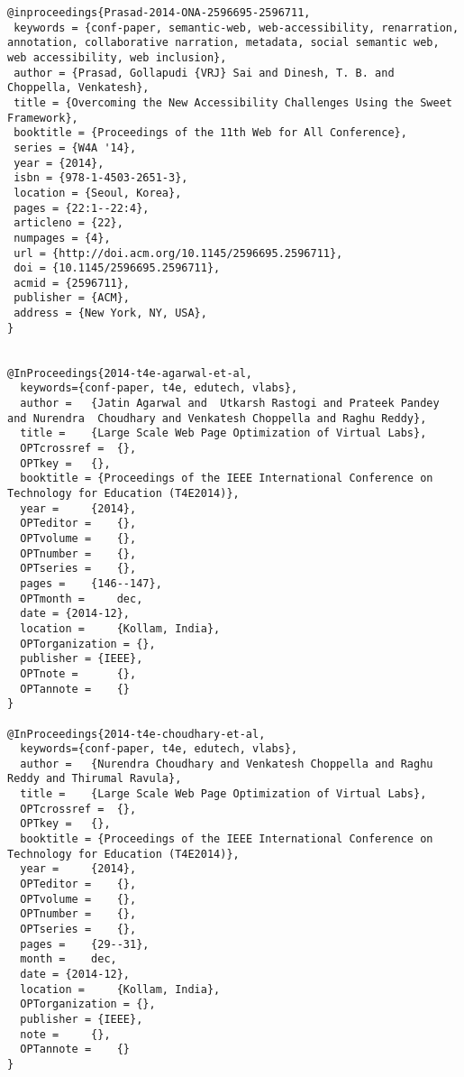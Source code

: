 \documentclass[11pt]{article}
\begin{document}
\begin{lstlisting}
@inproceedings{Prasad-2014-ONA-2596695-2596711,
 keywords = {conf-paper, semantic-web, web-accessibility, renarration, annotation, collaborative narration, metadata, social semantic web, web accessibility, web inclusion},
 author = {Prasad, Gollapudi {VRJ} Sai and Dinesh, T. B. and Choppella, Venkatesh},
 title = {Overcoming the New Accessibility Challenges Using the Sweet Framework},
 booktitle = {Proceedings of the 11th Web for All Conference},
 series = {W4A '14},
 year = {2014},
 isbn = {978-1-4503-2651-3},
 location = {Seoul, Korea},
 pages = {22:1--22:4},
 articleno = {22},
 numpages = {4},
 url = {http://doi.acm.org/10.1145/2596695.2596711},
 doi = {10.1145/2596695.2596711},
 acmid = {2596711},
 publisher = {ACM},
 address = {New York, NY, USA},
}


@InProceedings{2014-t4e-agarwal-et-al,
  keywords={conf-paper, t4e, edutech, vlabs},
  author = 	 {Jatin Agarwal and  Utkarsh Rastogi and Prateek Pandey and Nurendra  Choudhary and Venkatesh Choppella and Raghu Reddy},
  title = 	 {Large Scale Web Page Optimization of Virtual Labs},
  OPTcrossref =  {},
  OPTkey = 	 {},
  booktitle = {Proceedings of the IEEE International Conference on Technology for Education (T4E2014)},
  year = 	 {2014},
  OPTeditor = 	 {},
  OPTvolume = 	 {},
  OPTnumber = 	 {},
  OPTseries = 	 {},
  pages = 	 {146--147},
  OPTmonth = 	 dec,
  date = {2014-12},
  location = 	 {Kollam, India},
  OPTorganization = {},
  publisher = {IEEE},
  OPTnote = 	 {},
  OPTannote = 	 {}
}

@InProceedings{2014-t4e-choudhary-et-al,
  keywords={conf-paper, t4e, edutech, vlabs},
  author = 	 {Nurendra Choudhary and Venkatesh Choppella and Raghu Reddy and Thirumal Ravula},
  title = 	 {Large Scale Web Page Optimization of Virtual Labs},
  OPTcrossref =  {},
  OPTkey = 	 {},
  booktitle = {Proceedings of the IEEE International Conference on Technology for Education (T4E2014)},
  year = 	 {2014},
  OPTeditor = 	 {},
  OPTvolume = 	 {},
  OPTnumber = 	 {},
  OPTseries = 	 {},
  pages = 	 {29--31},
  month = 	 dec,
  date = {2014-12},
  location = 	 {Kollam, India},
  OPTorganization = {},
  publisher = {IEEE},
  note = 	 {},
  OPTannote = 	 {}
}
\end{lstlisting}
\end{document}
